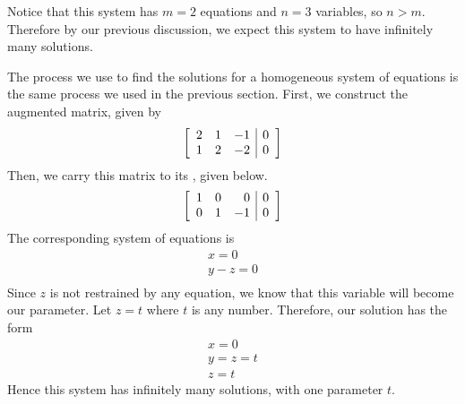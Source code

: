 \begin{solution}
Notice that this system has $m = 2$ equations and $n = 3$ variables, so $n>m$.
Therefore by our previous discussion, we expect this system to have infinitely many solutions. 

The process we use to find the solutions for a homogeneous system of equations
is the same process we used in the previous section. 
First, we construct the augmented matrix, given by 
\begin{equation*}
\left[
\begin{array}{rrr|r}
2 & 1 & -1 & 0 \\ 
1 & 2 & -2 & 0
\end{array}
\right]
\end{equation*}
Then, we carry this matrix to its \rref, given below. 
\begin{equation*}
\left[
\begin{array}{rrr|r}
1 & 0 & 0 & 0 \\ 
0 & 1 & -1 & 0
\end{array}
\right]
\end{equation*}
The corresponding system of equations is 
\begin{equation*}
\begin{array}{c}
x = 0 \\
y - z =0 \\
\end{array}
\end{equation*}
Since $z$ is not restrained by any equation, we know that this variable will become our parameter. 
Let $z=t$ where $t$ is any number. 
Therefore, our solution has the form
\begin{equation*}
\begin{array}{c}
x = 0 \\
y = z = t \\
z = t
\end{array}
\end{equation*}
Hence this system has infinitely many solutions, with one parameter $t$.
\end{solution}

